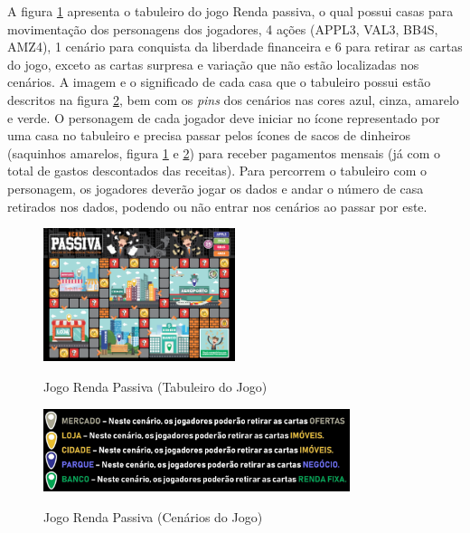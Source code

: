 A figura \ref{fig: figura08-tabuleiro} apresenta o tabuleiro do jogo Renda passiva, o qual possui casas para movimentação dos personagens dos jogadores, 4 ações (APPL3, VAL3, BB4S, AMZ4), 1 cenário para conquista da liberdade financeira e 6 para retirar as cartas do jogo, exceto as cartas surpresa e variação que não estão localizadas nos cenários. A imagem e o significado de cada casa que o tabuleiro possui estão descritos na figura \ref{fig: figura09-cenario-jogo}, bem com os \textit{pins} dos cenários nas cores azul, cinza, amarelo e verde.
O personagem de cada jogador deve iniciar no ícone representado por uma casa no tabuleiro e precisa passar pelos ícones de sacos de dinheiros (saquinhos amarelos, figura \ref{fig: figura08-tabuleiro} e \ref{fig: figura09-cenario-jogo}) para receber pagamentos mensais (já com o total de gastos descontados das receitas). Para percorrem o tabuleiro com o personagem, os jogadores deverão jogar os dados e andar o número de casa retirados nos dados, podendo ou não entrar nos cenários ao passar por este.

\graphicspath{{figuras/}}
\begin{figure}[!ht]
\centering
\begin{minipage}{1.\textwidth}
\caption{Jogo Renda Passiva (Tabuleiro do Jogo)}
\centering
\includegraphics[width=0.5\textwidth]{08-figura_tabuleiro-renda-passiva}
\label{fig: figura08-tabuleiro}
\end{minipage}
\end{figure}

\graphicspath{{figuras/}}
\begin{figure}[!ht]
\centering
\begin{minipage}{0.9\textwidth}
\caption{Jogo Renda Passiva (Cenários do Jogo)}
\centering
\includegraphics[width=0.8\textwidth]{09-figura_cenario-jogo-renda-passiva}
\label{fig: figura09-cenario-jogo}
\end{minipage}
\end{figure}

